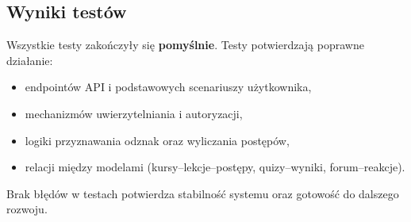 \documentclass[11pt,a4paper]{article}
\numberwithin{equation}{section}
\begin{document}
\subsection{Wyniki testów}
Wszystkie testy zakończyły się \textbf{pomyślnie}. Testy potwierdzają poprawne działanie:
\begin{itemize}
    \item endpointów API i podstawowych scenariuszy użytkownika,
    \item mechanizmów uwierzytelniania i autoryzacji,
    \item logiki przyznawania odznak oraz wyliczania postępów,
    \item relacji między modelami (kursy--lekcje--postępy, quizy--wyniki, forum--reakcje).
\end{itemize}

Brak błędów w testach potwierdza stabilność systemu oraz gotowość do dalszego rozwoju.
\end{document}
